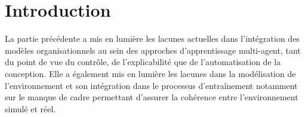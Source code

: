 
\chapter*{Introduction}

\noindent

La partie précédente a mis en lumière les lacunes actuelles dans l'intégration des modèles organisationnels au sein des approches d'apprentissage multi-agent, tant du point de vue du contrôle, de l'explicabilité que de l'automatisation de la conception. Elle a également mis en lumière les lacunes dans la modélisation de l'environnement et son intégration dans le processus d'entraînement notamment sur le manque de cadre permettant d'assurer la cohérence entre l'environnement simulé et réel.

\medskip

